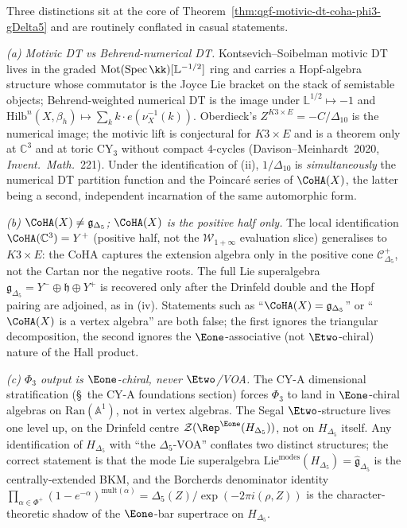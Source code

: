 \begin{remark}[Motivic wall-crossing, Behrend specialisation, and the \texorpdfstring{$\Eone$}{E1}/\texorpdfstring{$\Etwo$}{E2} boundary at \texorpdfstring{$d=3$}{d=3}]
\label{rem:qgf-motivic-dt-coha-phi3-gDelta5}
Three distinctions sit at the core of
Theorem~\ref{thm:qgf-motivic-dt-coha-phi3-gDelta5} and are routinely
conflated in casual statements.

\emph{(a) Motivic DT vs Behrend-numerical DT.} Kontsevich--Soibelman
motivic DT lives in the graded $\mathrm{Mot}(\mathrm{Spec}\,\kk)[\mathbb L^{-1/2}]$
ring and carries a Hopf-algebra structure whose commutator is the Joyce
Lie bracket on the stack of semistable objects; Behrend-weighted
numerical DT is the image under
$\mathbb L^{1/2}\mapsto -1$ and $\mathrm{Hilb}^n(X,\beta_h)\mapsto
\sum_k k\cdot e(\nu_X^{-1}(k))$. Oberdieck's
$Z^{K3\times E}=-C/\Delta_{10}$ is the numerical image; the
motivic lift is conjectural for $K3\times E$ and is a theorem only
at $\mathbb C^3$ and at toric $\mathrm{CY}_3$ without compact
$4$-cycles (Davison--Meinhardt~2020, \emph{Invent.\ Math.}\ 221).
Under the identification of (ii), $1/\Delta_{10}$ is \emph{simultaneously}
the numerical DT partition function and the Poincar\'e series of
$\CoHA(X)$, the latter being a second, independent incarnation
of the same automorphic form.

\emph{(b) $\CoHA(X)\neq\mathfrak g_{\Delta_5}$; $\CoHA(X)$ is the positive
half only.} The local identification
$\CoHA(\mathbb C^3)=Y^+$ (positive half, not the $\mathcal W_{1+\infty}$
evaluation slice) generalises to $K3\times E$: the CoHA captures the extension algebra
only in the positive cone $\mathcal C_{\Delta_5}^+$, not the Cartan
nor the negative roots. The full Lie superalgebra
$\mathfrak g_{\Delta_5}=Y^-\oplus\mathfrak h\oplus Y^+$ is recovered
only after the Drinfeld double and the Hopf pairing are adjoined, as in
(iv). Statements such as ``$\CoHA(X)=\mathfrak g_{\Delta_5}$'' or
``$\CoHA(X)$ is a vertex algebra'' are both false; the first ignores the
triangular decomposition, the second ignores the $\Eone$-associative
(not $\Etwo$-chiral) nature of the Hall product.

\emph{(c) $\Phi_3$ output is $\Eone$-chiral, never $\Etwo$/VOA.} The
CY-A dimensional stratification (\S~the CY-A foundations section) forces
$\Phi_3$ to land in $\Eone$-chiral algebras on
$\mathrm{Ran}(\mathbb A^1)$, not in vertex algebras. The Segal
$\Etwo$-structure lives one level up, on the Drinfeld centre
$\mathcal Z(\Rep^{\Eone}(H_{\Delta_5}))$, not on $H_{\Delta_5}$
itself. Any identification of $H_{\Delta_5}$ with
``the $\Delta_5$-VOA'' conflates two distinct structures; the correct statement
is that the mode Lie superalgebra
$\mathrm{Lie}^{\mathrm{modes}}(H_{\Delta_5})=\widehat{\mathfrak g}_{\Delta_5}$
is the centrally-extended BKM, and the Borcherds denominator identity
$\prod_{\alpha\in\Phi^+}(1-e^{-\alpha})^{\mathrm{mult}(\alpha)}
 =\Delta_5(Z)/\exp(-2\pi i(\rho,Z))$
is the character-theoretic shadow of the $\Eone$-bar supertrace on
$H_{\Delta_5}$.


\end{remark}
